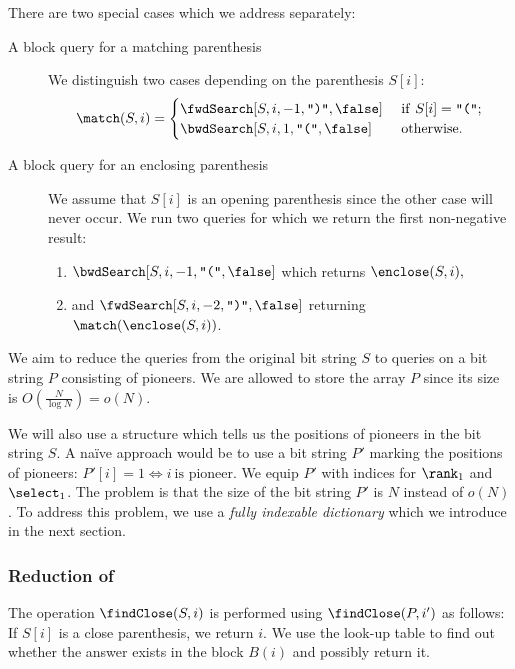 There are two special cases which we address separately:
\begin{description}
	\item[A block query for a matching parenthesis]
	We distinguish two cases depending on the parenthesis $S[i]$:
	$$\match(S, i) = \begin{cases}
		\fwdSearch[S, i, -1, \closingParen, \false] & \textif S[i] = \openingParen; \\
		\bwdSearch[S, i, 1, \openingParen, \false] & \textotherwise.
	\end{cases}$$
	
	\item[A block query for an enclosing parenthesis]
	We assume that $S[i]$ is an opening parenthesis since the other case will never occur.
	We run two queries for which we return the first non-negative result:
	\begin{enumerate}
		\item $\bwdSearch[S, i, -1, \openingParen, \false]$ which returns $\enclose(S, i),$
		\item and $\fwdSearch[S, i, -2, \closingParen, \false]$ returning $\match(\enclose(S, i))$.
	\end{enumerate}
\end{description}

\bigbreak

We aim to reduce the queries from the original bit string $S$ to queries on a bit string $P$ consisting of pioneers.
We are allowed to store the array $P$ since its size is $O\left(\frac{N}{\log N}\right) = o(N)$.

We will also use a structure which tells us the positions of pioneers in the bit string $S$.
A naïve approach would be to use a bit string $P'$ marking the positions of pioneers: $P'[i] = 1 \iff i\ \textrm{is pioneer}$. We equip $P'$ with indices for $\rank_1$ and $\select_1$.
The problem is that the size of the bit string $P'$ is $N$ instead of $o(N)$.
To address this problem, we use a \emph{fully indexable dictionary} which we introduce in the next section.

\subsubsection{Reduction of \findClose}

The operation $\findClose(S, i)$ is performed using $\findClose(P, i')$ as follows:
If $S[i]$ is a close parenthesis, we return $i$.
We use the look-up table to find out whether the answer exists in the block $B(i)$ and possibly return it.

